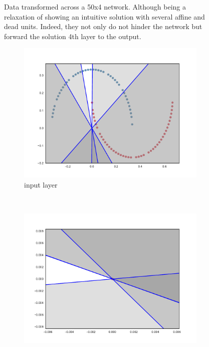 \begin{figure}
{{    }
  }
    \caption{Data transformed across a 50x4 \SepLayer network. Although being a relaxation of \SepUnitPoint showing an intuitive solution with several affine and dead units. Indeed, they not only do not hinder the network but forward the solution 4th layer to the output.}
    \label{fig:moonsLayerwise}
\end{figure}

\begin{figure}
  \centering
    \begin{subfigure}[b]{0.3\textwidth}
        \includegraphics[width=\textwidth]{img/init/relu/conv2d_1-0.pdf}
        \caption{\ReLU input layer}
        \label{fig:reluInitInput}
    \end{subfigure}
    ~ %
    \begin{subfigure}[b]{0.3\textwidth}
        \includegraphics[width=\textwidth]{img/init/relu/conv2d_50-0.pdf}

\end{subfigure}
\end{figure}
